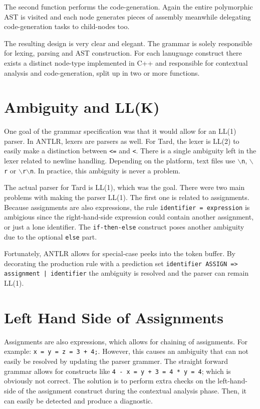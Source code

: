 \documentclass{report}
\begin{document}
The second function performs the code-generation. Again the entire polymorphic AST is visited and each node generates pieces of assembly meanwhile
delegating code-generation tasks to child-nodes too.

The resulting design is very clear and elegant. The grammar is solely responsible for lexing, parsing and AST construction. For each lanuguage
construct there exists a distinct node-type implemented in C++ and responsible for contextual analysis and code-generation, split up in two or
more functions.

\section{Ambiguity and LL(K)}

One goal of the grammar specification was that it would allow for an
LL(1) parser. In ANTLR, lexers are parsers as well. For Tard, the
lexer is LL(2) to easily make a distinction between \texttt{<=} and
\texttt{<}. There is a single ambiguity left in the lexer related to
newline handling. Depending on the platform, text files use
\texttt{$\backslash$n}, \texttt{$\backslash$r} or
\texttt{$\backslash$r$\backslash$n}. In practice, this ambiguity is
never a problem.

The actual parser for Tard is LL(1), which was the goal. There were
two main problems with making the parser LL(1). The first one is
related to assignments. Because assignments are also expressions,
the rule \texttt{identifier = expression} is ambigious since the
right-hand-side expression could contain another assignment, or just
a lone identifier. The \texttt{if-then-else} construct poses another
ambiguity due to the optional \texttt{else} part.

Fortunately, ANTLR allows for special-case peeks into the token
buffer. By decorating the production rule with a prediction set
\texttt{identifier ASSIGN => assignment | identifier} the ambiguity
is resolved and the parser can remain LL(1).

\section{Left Hand Side of Assignments}

Assignments are also expressions, which allows for chaining of
assignments. For example: \texttt{x = y = z = 3 + 4;}. However, this
causes an ambiguity that can not easily be resolved by updating the
parser grammer. The straight forward grammar allows for constructs
like \texttt{4 - x = y + 3 = 4 * y = 4}; which is obviously not
correct. The solution is to perform extra checks on the
left-hand-side of the assignment construct during the contextual
analysis phase. Then, it can easily be detected and produce a
diagnostic.
\end{document}
